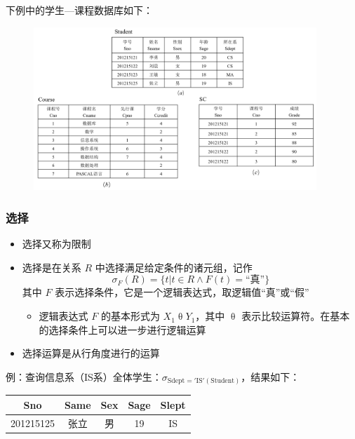 下例中的学生—课程数据库如下：
\begin{figure}[H]
    \vspace{-0.5em}
	\centering
	\includegraphics[width=0.95\textwidth]{images/2.3.2}
    \vspace{-1em}
\end{figure}

\subsubsection{选择}
\begin{itemize}
    \item 选择又称为限制
    \item 选择是在关系 $R$ 中选择满足给定条件的诸元组，记作
    $$\sigma_F (R)=\{t|t\in R \wedge F(t) = \mbox{“真”}\}$$
    其中 $F$ 表示选择条件，它是一个逻辑表达式，取逻辑值“真”或“假”
    \begin{itemize}
        \item 逻辑表达式 $F$ 的基本形式为 $X_1 \uptheta Y_1$，其中 $\uptheta$ 表示比较运算符。在基本的选择条件上可以进一步进行逻辑运算
    \end{itemize}
    \item 选择运算是从行角度进行的运算
\end{itemize}

例：查询信息系（IS系）全体学生：$\sigma _{\mathrm{Sdept='IS'}(\mathrm{Student})}$，结果如下：
\begin{table}[H]
    \centering
    \vspace{-0.5em}
    \begin{tabular}{|c|c|c|c|c|}
    \hline
    Sno       & Same & Sex & Sage & Slept \\\hline
    201215125 & 张立   & 男   & 19   & IS    \\\hline
    \end{tabular}
    \vspace{-1em}
\end{table}

